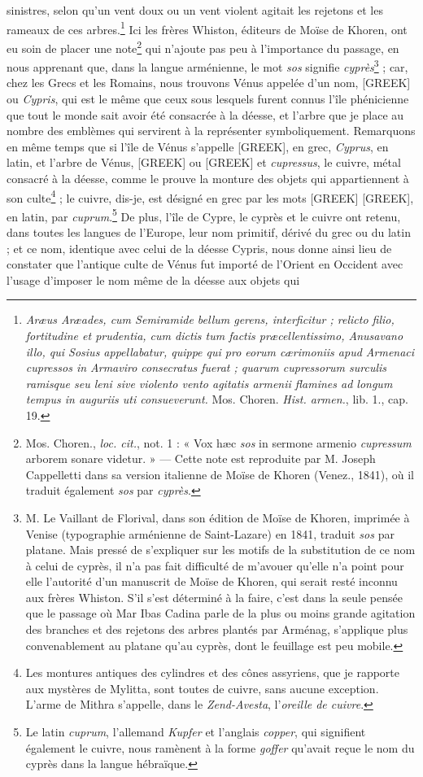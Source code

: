 \documentclass[a4paper, 11pt, oneside, polutonikogreek, french]{article}
\begin{document}
sinistres, selon qu'un vent doux ou un vent violent agitait les rejetons et les rameaux de ces arbres.\footnote{\emph{Aræus Aræades, cum Semiramide bellum gerens, interficitur ; relicto filio, fortitudine et prudentia, cum dictis tum factis præcellentissimo, Anusavano illo, qui Sosius appellabatur, quippe qui pro eorum cærimoniis apud Armenaci cupressos in Armaviro consecratus fuerat ; quarum cupressorum surculis ramisque seu leni sive violento vento agitatis armenii flamines ad longum tempus in auguriis uti consueverunt.} Mos. Choren. \emph{Hist. armen.}, lib. 1., cap. 19.} Ici les frères Whiston, éditeurs de Moïse de Khoren, ont eu soin de placer une note\footnote{Mos. Choren., \emph{loc. cit.}, not. 1 : « Vox hæc \emph{sos} in sermone armenio \emph{cupressum} arborem sonare videtur. » --- Cette note est reproduite par M. Joseph Cappelletti dans sa version italienne de Moïse de Khoren (Venez., 1841), où il traduit également \emph{sos} par \emph{cyprès}.} qui n'ajoute pas peu à l'importance du passage, en nous apprenant que, dans la langue arménienne, le mot \emph{sos} signifie \emph{cyprès}\footnote{M. Le Vaillant de Florival, dans son édition de Moïse de Khoren, imprimée à Venise (typographie arménienne de Saint-Lazare) en 1841, traduit \emph{sos} par platane. Mais pressé de s'expliquer sur les motifs de la substitution de ce nom à celui de cyprès, il n'a pas fait difficulté de m'avouer qu'elle n'a point pour elle l'autorité d'un manuscrit de Moïse de Khoren, qui serait resté inconnu aux frères Whiston. S'il s'est déterminé à la faire, c'est dans la seule pensée que le passage où Mar Ibas Cadina parle de la plus ou moins grande agitation des branches et des rejetons des arbres plantés par Arménag, s'applique plus convenablement au platane qu'au cyprès, dont le feuillage est peu mobile.} ; car, chez les Grecs et les Romains, nous trouvons Vénus appelée d'un nom, [GREEK] ou \emph{Cypris}, qui est le même que ceux sous lesquels furent connus l'île phénicienne que tout le monde sait avoir été consacrée à la déesse, et l'arbre que je place au nombre des emblèmes qui servirent à la représenter symboliquement. Remarquons en même temps que si l'île de Vénus s'appelle [GREEK], en grec, \emph{Cyprus}, en latin, et l'arbre de Vénus, [GREEK] ou [GREEK] et \emph{cupressus}, le cuivre, métal consacré à la déesse, comme le prouve la monture des objets qui appartiennent à son culte\footnote{Les montures antiques des cylindres et des cônes assyriens, que je rapporte aux mystères de Mylitta, sont toutes de cuivre, sans aucune exception. L'arme de Mithra s'appelle, dans le \emph{Zend-Avesta}, l'\emph{oreille de cuivre}.} ; le cuivre, dis-je, est désigné en grec par les mots [GREEK] [GREEK], en latin, par \emph{cuprum}.\footnote{Le latin \emph{cuprum}, l'allemand \emph{Kupfer} et l'anglais \emph{copper}, qui signifient également le cuivre, nous ramènent à la forme \emph{goffer} qu'avait reçue le nom du cyprès dans la langue hébraïque.} De plus, l'île de Cypre, le cyprès et le cuivre ont retenu, dans toutes les langues de l'Europe, leur nom primitif, dérivé du grec ou du latin ; et ce nom, identique avec celui de la déesse Cypris, nous donne ainsi lieu de constater que l'antique culte de Vénus fut importé de l'Orient en Occident avec l'usage d'imposer le nom même de la déesse aux objets qui 
\end{document}

